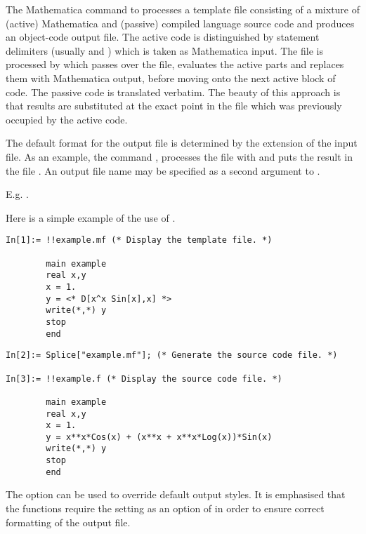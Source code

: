 \documentclass [12pt,twoside]{article}
\begin{document}
The Mathematica command  to processes a
template file consisting of a mixture of (active) Mathematica and (passive)
compiled language source code and produces an object-code output file. The active
code is distinguished by statement delimiters (usually \mma{<*} and \mma{*>})
which is taken as Mathematica input. The file is processed by  which
passes over the file, evaluates the active parts and replaces them with
Mathematica output, before moving onto the next active block of code.
The passive code is translated verbatim. The beauty of this approach is that results
are substituted at the exact point in the file which was previously occupied by
the active code.

The default format for the output file is determined by the extension of
the input file. As an example, the command
, processes the file 
with  and puts the result in the file . An output file
name may be specified as a second argument to .

\noindent
E.g. .

\pagebreak[2]
\noindent
Here is a simple example of the use of .
\begin{verbatim}
In[1]:= !!example.mf (* Display the template file. *)

        main example
        real x,y
        x = 1.
        y = <* D[x^x Sin[x],x] *>
        write(*,*) y
        stop
        end
\end{verbatim}

\pagebreak[2]

\begin{verbatim}
In[2]:= Splice["example.mf"]; (* Generate the source code file. *)

In[3]:= !!example.f (* Display the source code file. *)

        main example
        real x,y
        x = 1.
        y = x**x*Cos(x) + (x**x + x**x*Log(x))*Sin(x)
        write(*,*) y
        stop
        end
\end{verbatim}

\pagebreak[2]
\noindent
The  option  can be used to override
default output styles. It is emphasised that the  functions require
the setting  as an option of  in order to
ensure correct formatting of the output file.
\end{document}
